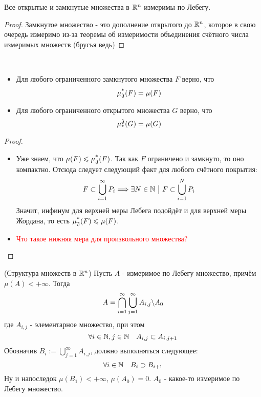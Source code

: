 \begin{corollary}
	Все открытые и замкнутые множества в $\mathbb{R}^n$ измеримы по Лебегу.
\end{corollary}

\begin{proof}
	Замкнутое множество - это дополнение открытого до $\mathbb{R}^n$, которое в свою очередь измеримо из-за теоремы об измеримости объединения счётного числа измеримых множеств (брусья ведь)
\end{proof}

\begin{corollary}~
	\begin{itemize}
		\item Для любого ограниченного замкнутого множества $F$ верно, что
		\[
			\operatorname{\mu^*_\mathfrak{J}}(F) = \mu(F)
		\]
		
		\item Для любого ограниченного открытого множества $G$ верно, что
		\[
			\operatorname{\mu^\mathfrak{J}_*}(G) = \mu(G)
		\]
	\end{itemize}
\end{corollary}

\begin{proof}~
	\begin{itemize}
		\item Уже знаем, что $\mu(F) \leqslant \operatorname{\mu^*_\mathfrak{J}}(F)$. Так как $F$ ограничено и замкнуто, то оно компактно. Отсюда следует следующий факт для любого счётного покрытия:
		\[
			F \subset \bigcup_{i = 1}^\infty P_i \Longrightarrow \exists N \in \mathbb{N} \ \big|\  F \subset \bigcup_{i = 1}^N P_i
		\]
		Значит, инфинум для верхней меры Лебега подойдёт и для верхней меры Жордана, то есть $\operatorname{\mu^*_\mathfrak{J}}(F) \leqslant \mu(F)$.
		
		\item \textcolor{red}{Что такое нижняя мера для произвольного множества?}
	\end{itemize}
\end{proof}

\begin{theorem} (Структура множеств в $\mathbb{R}^n$)
	 Пусть $A$ - измеримое по Лебегу множество, причём $\mu(A) < +\infty$. Тогда
	 \[
	 	A = \bigcap_{i = 1}^\infty \bigcup_{j = 1}^\infty A_{i, j} \backslash A_0
	 \]
	 где $A_{i, j}$ - элементарное множество, при этом
	 \[
	 	\forall i \in \mathbb{N}, j \in \mathbb{N} \quad A_{i, j} \subset A_{i, j + 1}
	 \]
	 Обозначив $B_i := \bigcup_{j = 1}^\infty A_{i, j}$, должно выполняться следующее:
	 \[
	 	\forall i \in \mathbb{N} \quad B_i \supset B_{i + 1}
	 \]
	 Ну и напоследок $\mu(B_1) < +\infty$, $\mu(A_0) = 0$. $A_0$ - какое-то измеримое по Лебегу множество.
\end{theorem}

